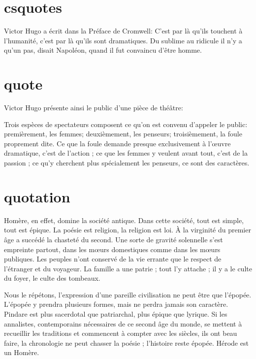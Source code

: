 \documentclass{article}
\begin{document}
\section{csquotes}

Victor Hugo a écrit dans la Préface de Cromwell: C’est par là qu’ils  touchent à l’humanité, c’est par là qu’ils sont dramatiques. Du sublime au ridicule il n’y a qu’un pas, disait Napoléon, quand il fut convaincu d’être homme.

\section{quote}


Victor Hugo présente ainsi le public d'une pièce de théâtre:

Trois espèces de spectateurs composent ce qu’on est convenu d’appeler le public: premièrement, les femmes; deuxièmement, les penseurs; troisièmement, la foule proprement dite. Ce que la foule demande presque exclusivement à l’œuvre dramatique, c’est de l’action ; ce que les femmes y veulent avant tout, c’est de la passion ; ce qu’y cherchent plus spécialement les penseurs, ce sont des caractères.


\section{quotation}

Homère, en effet, domine la société antique. Dans cette société, tout est simple, tout est épique. La poésie est religion, la religion est loi. À la virginité du premier âge a succédé la chasteté du second. Une sorte de gravité solennelle s’est empreinte partout, dans les mœurs domestiques comme dans les mœurs publiques. Les peuples n’ont conservé de la vie errante que le respect de l’étranger et du voyageur. La famille a une patrie ; tout l’y attache ; il y a le culte du foyer, le culte des tombeaux.

Nous le répétons, l’expression d’une pareille civilisation ne peut être que l’épopée. L’épopée y prendra plusieurs formes, mais ne perdra jamais son caractère. Pindare est plus sacerdotal que patriarchal, plus épique que lyrique. Si les annalistes, contemporains nécessaires de ce second âge du monde, se mettent à recueillir les traditions et commencent à compter avec les siècles, ils ont beau faire, la chronologie ne peut chasser la poésie ; l’histoire reste épopée. Hérode est un Homère.
\end{document}
